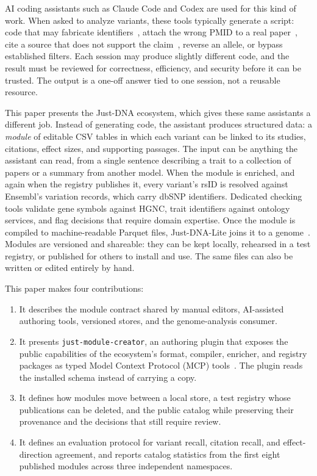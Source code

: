 \documentclass[11pt,a4paper]{article}
\begin{document}
AI coding assistants such as Claude Code and Codex are used for this kind of
work. When asked to analyze variants, these tools
typically generate a script: code that may fabricate
identifiers~\citep{shang2025geneturing}, attach the wrong PMID to a real
paper~\citep{bhattacharyya2023high}, cite a source that does not support the
claim~\citep{gao2023enabling}, reverse an allele, or bypass
established filters. Each session may produce slightly different code, and the
result must be reviewed for correctness, efficiency, and security before it can
be trusted. The output is a one-off answer tied to one session, not a reusable
resource.

This paper presents the Just-DNA ecosystem, which gives these same assistants a
different job. Instead of generating code, the assistant produces structured
data: a \emph{module} of editable CSV tables in which each variant can be linked to its
studies, citations, effect sizes, and supporting passages. The input can be
anything the assistant can read, from a single sentence describing a trait to a
collection of papers or a summary from another model. When the module is
enriched, and again when the registry publishes it, every variant's rsID is
resolved against Ensembl's variation records, which carry dbSNP identifiers.
Dedicated checking tools validate
gene symbols against HGNC, trait identifiers against ontology services, and flag
decisions that require domain expertise.
Once the module is compiled to machine-readable Parquet files, Just-DNA-Lite
joins it to a genome~\citep{companion2026justdnalite}. Modules are versioned and
shareable: they can be kept locally, rehearsed in a test registry, or
published for others to install and use. The same files can also be written or
edited entirely by hand.

This paper makes four contributions:

\begin{enumerate}
    \item It describes the module contract shared by manual editors, AI-assisted
    authoring tools, versioned stores, and the genome-analysis consumer.
    \item It presents \texttt{just-module-creator}, an authoring plugin that
    exposes the public capabilities of the ecosystem's format, compiler,
    enricher, and registry packages as typed Model Context Protocol (MCP)
    tools~\citep{anthropic2024mcp}.
    The plugin reads the installed schema instead of carrying a copy.
    \item It defines how modules move between a local store, a test registry
    whose publications can be deleted, and the public catalog while
    preserving their provenance and the
    decisions that still require review.
    \item It defines an evaluation protocol for variant recall, citation
    recall, and effect-direction agreement, and reports catalog statistics
    from the first eight published modules across three independent namespaces.
\end{enumerate}
\end{document}
